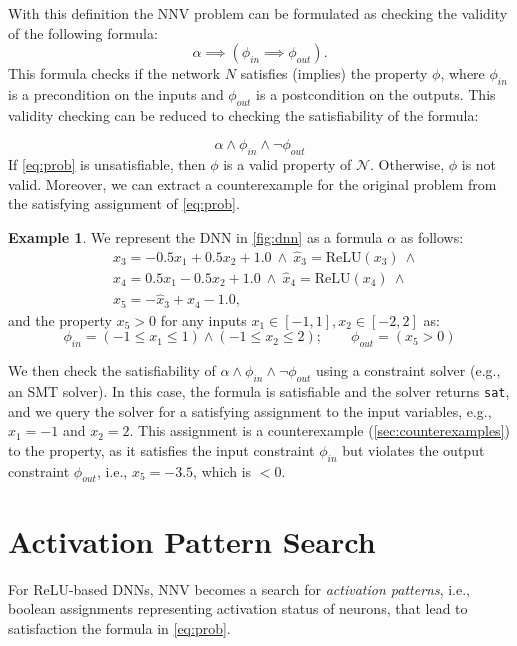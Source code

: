 \documentclass[oneside,11pt,dvipsnames]{book}
\numberwithin{equation}{section}
\theoremstyle{definition}
\newtheorem{example}{Example}[section]
\theoremstyle{remark}
\newcommand{\relu}[1]{\mathrm{ReLU}\left(#1\right)}
\newcommand{\sat}{\texttt{sat}}
\begin{document}
With this definition the NNV problem can be formulated as checking the validity of the following formula:
\begin{equation}\label{eq:nnv}
    \alpha \implies (\phi_{in} \implies \phi_{out}).
\end{equation}
This formula checks if the network $N$ satisfies (implies) the property $\phi$, where $\phi_{in}$ is a precondition on the inputs and $\phi_{out}$ is a postcondition on the outputs. This validity checking can be reduced to checking the satisfiability of the formula:

\begin{equation}\label{eq:prob}
  \alpha \land \phi_{in} \land \neg \phi_{out}
\end{equation}
If \autoref{eq:prob} is unsatisfiable, then $\phi$ is a valid property of $\mathcal{N}$. Otherwise, $\phi$ is not valid.  Moreover, we can extract a counterexample for the original problem from the satisfying assignment of \autoref{eq:prob}.

\begin{example}\label{ex:dnn-sat}
We represent the DNN in \autoref{fig:dnn} as a formula $\alpha$ as follows:
\begin{align*}
& x_3 = -0.5x_1 + 0.5x_2 + 1.0 ~\land~ \hat{x}_3 = \relu{x_3} ~\land \\
& x_4 = 0.5x_1 - 0.5x_2 + 1.0  ~\land~ \hat{x}_4 = \relu{x_4} ~\land \\
& x_5 = -\hat{x}_3 + \hat{x}_4 - 1.0,
\end{align*}
\noindent and the property $x_5 > 0$ for any inputs $x_1 \in [-1,1], x_2\in[-2,2]$ as:
\begin{equation*}
\phi_{in} = (-1 \le x_1 \le 1) \land (-1 \le x_2 \le 2); \qquad
\phi_{out} = (x_5 > 0)
\end{equation*}

We then check the satisfiability of $\alpha \land \phi_{in} \land \neg \phi_{out}$ using a constraint solver (e.g., an SMT solver).  In this case, the formula is satisfiable and the solver returns \sat{}, and we query the solver for a satisfying assignment to the input variables, e.g., $x_1=-1$ and $x_2=2$. This assignment is a counterexample (\autoref{sec:counterexamples}) to the property, as it satisfies the input constraint $\phi_{in}$ but violates the output constraint $\phi_{out}$, i.e., $x_5 = -3.5$, which is  $< 0$.

\end{example}

\section{Activation Pattern Search}\label{sec:activation-pattern}
 For ReLU-based DNNs, NNV becomes a search for \emph{activation patterns}, i.e., boolean assignments representing activation status of neurons, that lead to satisfaction the formula in \autoref{eq:prob}. 
\end{document}

